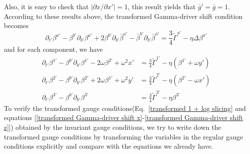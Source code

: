 \documentclass[letterpaper,nofootinbib,prd,amsmath,onecolumn]{revtex4-1}
\begin{document}
Also, it is easy to check that $|\partial x/\partial x'| = 1$, this result yields that ${\bar g}' = {\bar g} = 1$. According to these results above, the transformed Gamma-driver shift condition becomes
\begin{equation}
\partial_{t'}\beta^{a'} - \beta^{b'}\partial_{b'}\beta^{a'} + 2\beta^{b'}\partial_{b'}{\bar \beta}^{a'} - {\bar \beta}^{b'}\partial_{b'}{\bar \beta}^{a'} = \frac{3}{4}{\tilde \Gamma}^{a'} - \eta \Delta \beta^{a'}
\end{equation}
and for each component, we have
\begin{align}
\partial_{t'}\beta^{1'} - \beta^{b'}\partial_{b'}\beta^{1'} - 2\omega\beta^{2'} + \omega^{2}x' &= \frac{3}{4}{\tilde \Gamma}^{1'} - \eta (\beta^{1'} + \omega y')\label{transformed Gamma-driver shift x}\\
\partial_{t'}\beta^{2'} - \beta^{b'}\partial_{b'}\beta^{2'} + 2\omega\beta^{1'} + \omega^{2}y' &= \frac{3}{4}{\tilde \Gamma}^{2'} - \eta (\beta^{2'} - \omega x')\label{transformed Gamma-driver shift y}\\
\partial_{t'}\beta^{3'} - \beta^{b'}\partial_{b'}\beta^{3'} & = \frac{3}{4}{\tilde \Gamma}^{3'} - \eta \beta^{3'}\label{transformed Gamma-driver shift z}
\end{align}
To verify the transformed gauge conditions(Eq.~\ref{transformed 1 + log slicing} and equations [\ref{transformed Gamma-driver shift x}-\ref{transformed Gamma-driver shift z}]) obtained by the invariant gauge conditions, we try to write down the transformed gauge conditions by transforming the variables in the regular gauge conditions explicitly and compare with the equations we already have. 
\end{document}

